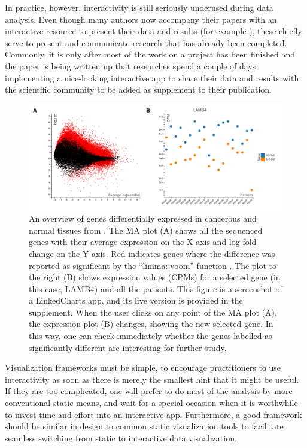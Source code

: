 \documentclass[twocolumn,10pt]{article}
\begin{document}
In practice, however, interactivity is still seriously underused during data analysis. Even though many authors now accompany their papers with an interactive resource to present their data and results (for example \citet{travaglini_2020, roider_2020, kalucka_2020}), these chiefly serve to present and communicate research that has already been completed. Commonly, it is only after most of the work on a project has been finished and the paper is being written up that researches spend a couple of days implementing a nice-looking interactive app to share their data and results with the scientific community \citep{batch_2017} to be added as supplement to their publication. 

\begin{figure}[b]
	\includegraphics[width=\textwidth]{FigD/figD.png}
	\caption{An overview of genes differentially expressed in cancerous and normal tissues from \citet{conway_2015}. The MA plot (A) shows all the sequenced genes with their average expression on the X-axis and log-fold change on the Y-axis. Red indicates genes where the difference was reported as significant by the ``limma::voom'' function \citep{law_2014}. The plot to the right (B) shows expression values (CPMs) for a selected gene (in this case, LAMB4) and all the patients. This figure is a screenshot of a LinkedCharts app, and its live version is provided in the supplement. When the user clicks on any point of the MA plot (A), the expression plot (B) changes, showing the new selected gene. In this way, one can check immediately whether the genes labelled as significantly different are interesting for further study.}  
	\label{FigD}
\end{figure}

Visualization frameworks must be simple, to encourage practitioners to use interactivity as soon as there is merely the smallest hint that it might be useful. If they are too complicated, one will prefer to do most of the analysis by more conventional static means, and wait for a special occasion when it is worthwhile to invest time and effort into an interactive app. Furthermore, a good framework should be similar in design to common static visualization tools to facilitate seamless switching from static to interactive data visualization.
\end{document}
